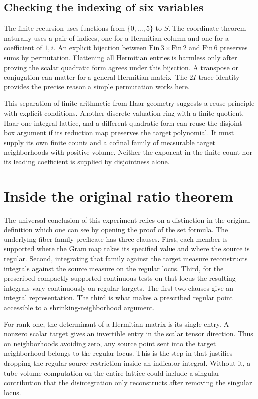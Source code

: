 \documentclass[12pt,letterpaper]{article}
\newcommand{\code}[1]{\texttt{\detokenize{#1}}}
\begin{document}
\subsection{Checking the indexing of six variables}
The finite recursion uses functions from $\{0,\ldots,5\}$ to $S$. The coordinate theorem naturally uses a pair of indices, one for a Hermitian column and one for a coefficient of $1,i$. An explicit bijection between $\mathrm{Fin}\,3\times\mathrm{Fin}\,2$ and $\mathrm{Fin}\,6$ preserves sums by permutation. Flattening all Hermitian entries is harmless only after proving the scalar quadratic form agrees under this bijection. A transpose or conjugation can matter for a general Hermitian matrix. The $2I$ trace identity provides the precise reason a simple permutation works here.
\par
This separation of finite arithmetic from Haar geometry suggests a reuse principle with explicit conditions. Another discrete valuation ring with a finite quotient, Haar-one integral lattice, and a different quadratic form can reuse the disjoint-box argument if its reduction map preserves the target polynomial. It must supply its own finite counts and a cofinal family of measurable target neighborhoods with positive volume. Neither the exponent in the finite count nor its leading coefficient is supplied by disjointness alone.
\section{Inside the original ratio theorem}
The universal conclusion of this experiment relies on a distinction in the original definition which one can see by opening the proof of the set formula. The underlying fiber-family predicate has three clauses. First, each member is supported where the Gram map takes its specified value and where the source is regular. Second, integrating that family against the target measure reconstructs integrals against the source measure on the regular locus. Third, for the prescribed compactly supported continuous tests on that locus the resulting integrals vary continuously on regular targets. The first two clauses give an integral representation. The third is what makes a prescribed regular point accessible to a shrinking-neighborhood argument.
\par
For rank one, the determinant of a Hermitian matrix is its single entry. A nonzero scalar target gives an invertible entry in the scalar tensor direction. Thus on neighborhoods avoiding zero, any source point sent into the target neighborhood belongs to the regular locus. This is the step in \code{mass_eq_lintegral} that justifies dropping the regular-source restriction inside an indicator integral. Without it, a tube-volume computation on the entire lattice could include a singular contribution that the disintegration only reconstructs after removing the singular locus.
\end{document}
